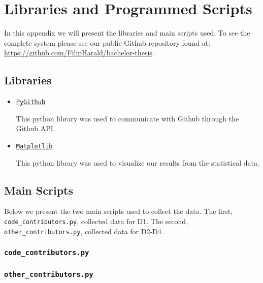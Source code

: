 \section{Libraries and Programmed Scripts}
\label{ap:scripts}
In this appendix we will present the libraries and main scripts used. To see the complete system please see our public Github repository found at: \url{https://github.com/FilipHarald/bachelor-thesis}.

\subsection*{Libraries}
\begin{itemize}
  \item\href{http://pygithub.readthedocs.io/}{\texttt{PyGithub}}


  This python library was used to communicate with Github through the Github API.
  \item\href{http://matplotlib.org/}{\texttt{Matplotlib}}

  This python library was used to visualize our results from the statistical data.
\end{itemize}

\subsection*{Main Scripts}
Below we present the two main scripts used to collect the data. The first, \texttt{code\_contributors.py}, collected data for D1. The second, \texttt{other\_contributors.py}, collected data for D2-D4.

\subsubsection*{\texttt{code\_contributors.py}}

\subsubsection*{\texttt{other\_contributors.py}}

